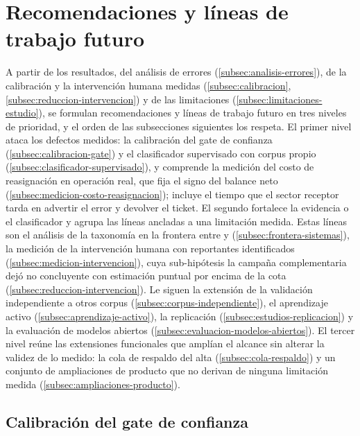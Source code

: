 \section{Recomendaciones y líneas de trabajo futuro}\label{sec:recomendaciones}

A partir de los resultados, del análisis de errores (\autoref{subsec:analisis-errores}), de la calibración y la intervención humana medidas (\autoref{subsec:calibracion}, \autoref{subsec:reduccion-intervencion}) y de las limitaciones (\autoref{subsec:limitaciones-estudio}), se formulan recomendaciones y líneas de trabajo futuro en tres niveles de prioridad, y el orden de las subsecciones siguientes los respeta. El primer nivel ataca los defectos medidos: la calibración del gate de confianza (\autoref{subsec:calibracion-gate}) y el clasificador supervisado con corpus propio (\autoref{subsec:clasificador-supervisado}), y comprende la medición del costo de reasignación en operación real, que fija el signo del balance neto (\autoref{subsec:medicion-costo-reasignacion}); incluye el tiempo que el sector receptor tarda en advertir el error y devolver el ticket. El segundo fortalece la evidencia o el clasificador y agrupa las líneas ancladas a una limitación medida. Estas líneas son el análisis de la taxonomía en la frontera entre  y  (\autoref{subsec:frontera-sistemas}), la medición de la intervención humana con reportantes identificados (\autoref{subsec:medicion-intervencion}), cuya sub-hipótesis la campaña complementaria dejó no concluyente con estimación puntual por encima de la cota (\autoref{subsec:reduccion-intervencion}). Le siguen la extensión de la validación independiente a otros corpus (\autoref{subsec:corpus-independiente}), el aprendizaje activo (\autoref{subsec:aprendizaje-activo}), la replicación (\autoref{subsec:estudios-replicacion}) y la evaluación de modelos abiertos (\autoref{subsec:evaluacion-modelos-abiertos}). El tercer nivel reúne las extensiones funcionales que amplían el alcance sin alterar la validez de lo medido: la cola de respaldo del alta (\autoref{subsec:cola-respaldo}) y un conjunto de ampliaciones de producto que no derivan de ninguna limitación medida (\autoref{subsec:ampliaciones-producto}).

\subsection{Calibración del gate de confianza}\label{subsec:calibracion-gate}

